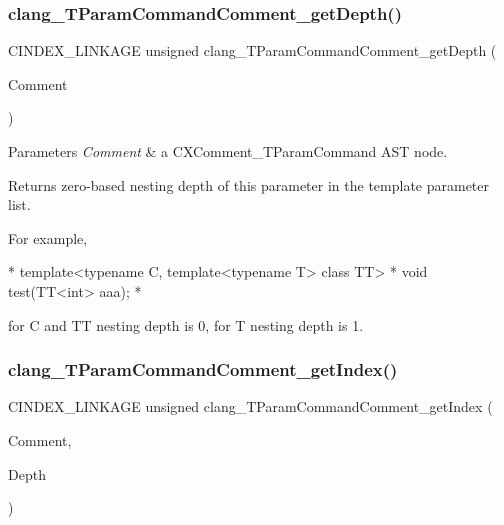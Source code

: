 \subsubsection{\texorpdfstring{clang\+\_\+\+T\+Param\+Command\+Comment\+\_\+get\+Depth()}{clang\_TParamCommandComment\_getDepth()}}
{\footnotesize\ttfamily C\+I\+N\+D\+E\+X\+\_\+\+L\+I\+N\+K\+A\+GE unsigned clang\+\_\+\+T\+Param\+Command\+Comment\+\_\+get\+Depth (\begin{DoxyParamCaption}\item[{\mbox{\hyperlink{structCXComment}{C\+X\+Comment}}}]{Comment }\end{DoxyParamCaption})}


\begin{DoxyParams}{Parameters}
{\em Comment} & a {\ttfamily C\+X\+Comment\+\_\+\+T\+Param\+Command} A\+ST node.\\
\hline
\end{DoxyParams}
\begin{DoxyReturn}{Returns}
zero-\/based nesting depth of this parameter in the template parameter list.
\end{DoxyReturn}
For example, \begin{DoxyVerb}*     template<typename C, template<typename T> class TT>
*     void test(TT<int> aaa);
* \end{DoxyVerb}
 for C and TT nesting depth is 0, for T nesting depth is 1. \mbox{\label{group__CINDEX__COMMENT_ga0b91d26f02a476076b6dc5b5eea59a8f}} 
\subsubsection{\texorpdfstring{clang\+\_\+\+T\+Param\+Command\+Comment\+\_\+get\+Index()}{clang\_TParamCommandComment\_getIndex()}}
{\footnotesize\ttfamily C\+I\+N\+D\+E\+X\+\_\+\+L\+I\+N\+K\+A\+GE unsigned clang\+\_\+\+T\+Param\+Command\+Comment\+\_\+get\+Index (\begin{DoxyParamCaption}\item[{\mbox{\hyperlink{structCXComment}{C\+X\+Comment}}}]{Comment,  }\item[{unsigned}]{Depth }\end{DoxyParamCaption})}


